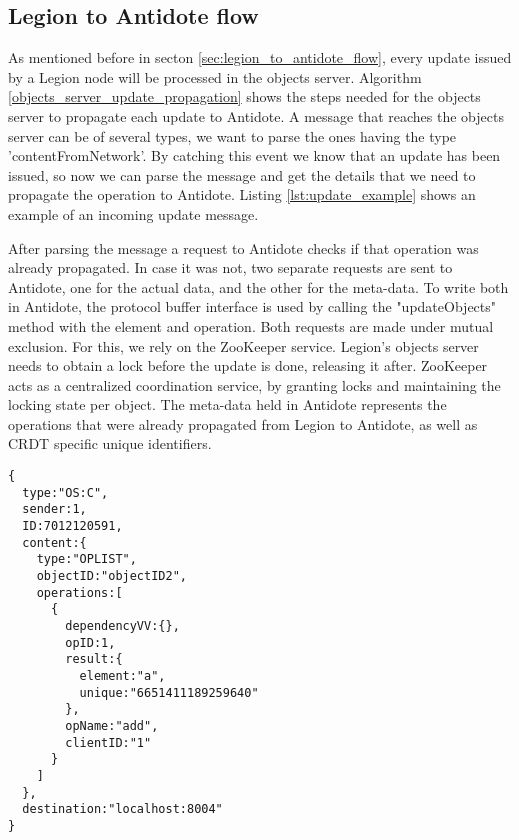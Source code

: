 \subsection{Legion to Antidote flow}
\label{sec:legion_changes_legion_to_antidote_flow}
As mentioned before in secton \ref{sec:legion_to_antidote_flow}, every update issued by a Legion node will be processed in the objects server. Algorithm \ref{objects_server_update_propagation} shows the steps needed for the objects server to propagate each update to Antidote. A message that reaches the objects server can be of several types, we want to parse the ones having the type 'contentFromNetwork'. By catching this event we know that an update has been issued, so now we can parse the message and get the details that we need to propagate the operation to Antidote. Listing \ref{lst:update_example} shows an example of an incoming update message.\par
	After parsing the message a request to Antidote checks if that operation was already propagated. In case it was not, two separate requests are sent to Antidote, one for the actual data, and the other for the meta-data. To write both in Antidote, the protocol buffer interface is used by calling the "updateObjects" method with the element and operation. Both requests are made under mutual exclusion. For this, we rely on the ZooKeeper service. Legion's objects server needs to obtain a lock before the update is done, releasing it after. ZooKeeper acts as a centralized coordination service, by granting locks and maintaining the locking state per object. The meta-data held in Antidote represents the operations that were already propagated from Legion to Antidote, as well as CRDT specific unique identifiers.
	
\begin{lstlisting}[caption={Legion update content message example},label={lst:update_example}]
{
  type:"OS:C",
  sender:1,
  ID:7012120591,
  content:{
    type:"OPLIST",
    objectID:"objectID2",
    operations:[
      {
        dependencyVV:{},
        opID:1,
        result:{
          element:"a",
          unique:"6651411189259640"
        },
        opName:"add",
        clientID:"1"
      }
    ]
  },
  destination:"localhost:8004"
}
\end{lstlisting}


